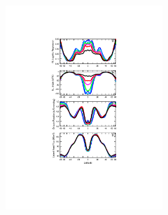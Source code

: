 {\begin{figure}[t]
\begin{center}
\noindent\includegraphics[width=14pc,angle=0]{chapter6/temp_zonal_4reg_dwn.pdf}\\
\end{center}
\caption{}
\label{fig:4reg}
\end{figure}

}

